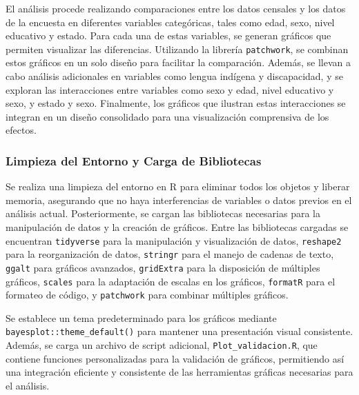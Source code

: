\documentclass[
  12pt,
]{book}
\begin{document}
El análisis procede realizando comparaciones entre los datos censales y los datos de la encuesta en diferentes variables categóricas, tales como edad, sexo, nivel educativo y estado. Para cada una de estas variables, se generan gráficos que permiten visualizar las diferencias. Utilizando la librería \texttt{patchwork}, se combinan estos gráficos en un solo diseño para facilitar la comparación. Además, se llevan a cabo análisis adicionales en variables como lengua indígena y discapacidad, y se exploran las interacciones entre variables como sexo y edad, nivel educativo y sexo, y estado y sexo. Finalmente, los gráficos que ilustran estas interacciones se integran en un diseño consolidado para una visualización comprensiva de los efectos.

\hypertarget{limpieza-del-entorno-y-carga-de-bibliotecas-2}{%
\subsubsection*{Limpieza del Entorno y Carga de Bibliotecas}\label{limpieza-del-entorno-y-carga-de-bibliotecas-2}}

Se realiza una limpieza del entorno en R para eliminar todos los objetos y liberar memoria, asegurando que no haya interferencias de variables o datos previos en el análisis actual. Posteriormente, se cargan las bibliotecas necesarias para la manipulación de datos y la creación de gráficos. Entre las bibliotecas cargadas se encuentran \texttt{tidyverse} para la manipulación y visualización de datos, \texttt{reshape2} para la reorganización de datos, \texttt{stringr} para el manejo de cadenas de texto, \texttt{ggalt} para gráficos avanzados, \texttt{gridExtra} para la disposición de múltiples gráficos, \texttt{scales} para la adaptación de escalas en los gráficos, \texttt{formatR} para el formateo de código, y \texttt{patchwork} para combinar múltiples gráficos.

Se establece un tema predeterminado para los gráficos mediante \texttt{bayesplot::theme\_default()} para mantener una presentación visual consistente. Además, se carga un archivo de script adicional, \texttt{Plot\_validacion.R}, que contiene funciones personalizadas para la validación de gráficos, permitiendo así una integración eficiente y consistente de las herramientas gráficas necesarias para el análisis.
\end{document}

